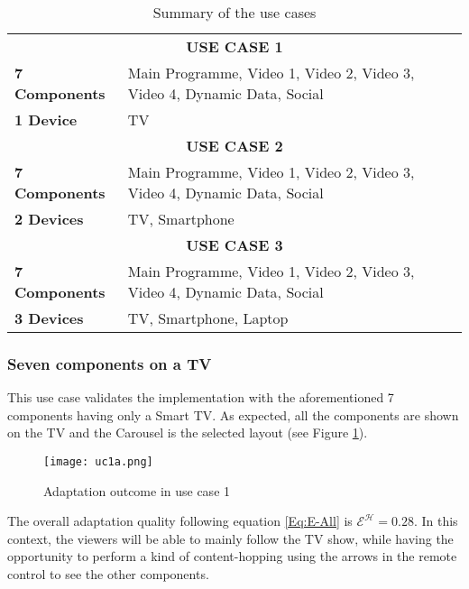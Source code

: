 \begin{table}
	\centering
	\caption {Summary of the use cases}\label{tab:valuc}
	\begin{tabular}{||l|p{11cm}||}
		\hline
		
		\multicolumn{2}{||c||}{\cellcolor{lightgray}\textbf{USE CASE 1}} \\
		\textbf{7 Components} & Main Programme, Video 1, Video 2, Video 3, Video 4, Dynamic Data, Social \\
		\hline
		\textbf{1 Device} & TV\\
		\hline
		\multicolumn{2}{||c||}{\cellcolor{lightgray}\textbf{USE CASE 2}} \\
		\hline
		\textbf{7 Components} & Main Programme, Video 1, Video 2, Video 3, Video 4, Dynamic Data, Social \\
		\hline
		\textbf{2 Devices} & TV, Smartphone\\
		\hline
		\multicolumn{2}{||c||}{\cellcolor{lightgray}\textbf{USE CASE 3}} \\
		\hline
		\textbf{7 Components} & Main Programme, Video 1, Video 2, Video 3, Video 4, Dynamic Data, Social \\
		\hline
		\textbf{3 Devices} & TV, Smartphone, Laptop \\
		\hline
		
	\end{tabular}
\end{table}



\subsubsection{Seven components on a TV}

This use case validates the implementation with the aforementioned 7 components having only a Smart TV. As expected, all the components are shown on the TV and the Carousel is the selected layout (see Figure \ref{fig:uc1a}).

\begin{figure}
	\begin{center}
		\texttt{[image: uc1a.png]}
		\caption{Adaptation outcome in use case 1}
		\label{fig:uc1a}
	\end{center}
\end{figure} 

The overall adaptation quality following equation \ref{Eq:E-All} is $\mathcal{E}^\mathcal{H} = 0.28$. In this context, the viewers will be able to mainly follow the TV show, while having the opportunity to perform a kind of content-hopping using the arrows in the remote control to see the other components.

